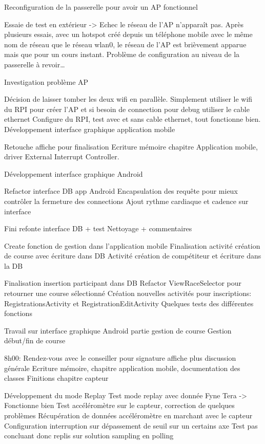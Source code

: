 \begin{multicols}{2}
Reconfiguration de la passerelle pour avoir un AP fonctionnel

Essaie de test en extérieur -> Echec le réseau de l’AP n’apparaît pas. Après plusieurs essais, avec un hotspot créé depuis un téléphone mobile avec le même nom de réseau que le réseau wlan0, le réseau de l’AP est brièvement apparue mais que pour un cours instant. Problème de configuration au niveau de la passerelle à revoir…

Investigation problème AP

Décision de laisser tomber les deux wifi en parallèle. Simplement utiliser le wifi du RPI pour créer l’AP et si besoin de connection pour debug utiliser le cable ethernet
Configure du RPI, test avec et sans cable ethernet, tout fonctionne bien.
Développement interface graphique application mobile

Retouche affiche pour finalisation
Ecriture mémoire chapitre Application mobile, driver External Interrupt Controller.

Développement interface graphique Android

Refactor interface DB app Android
Encapsulation des requête pour mieux contrôler la fermeture des connections
Ajout rythme cardiaque et cadence sur interface

Fini refonte interface DB + test
Nettoyage + commentaires

Create fonction de gestion dans l’application mobile
Finalisation activité création de course avec écriture dans DB
Activité création de compétiteur et écriture dans la DB

Finalisation insertion participant dans DB
Refactor ViewRaceSelector pour retourner une course sélectionné
Création nouvelles activités pour inscriptions: RegistrationsActivity et RegistrationEditActivity
Quelques tests des différentes fonctions

Travail sur interface graphique Android partie gestion de course
Gestion début/fin de course

8h00: Rendez-vous avec le conseiller pour signature affiche plus discussion générale
Ecriture mémoire, chapitre application mobile, documentation des classes
Finitions chapitre capteur

Développement du mode Replay
Test mode replay avec donnée Fyne Tera -> Fonctionne bien
Test accéléromètre sur le capteur, correction de quelques problèmes
Récupération de données accéléromètre en marchant avec le capteur
Configuration interruption sur dépassement de seuil sur un certains axe
Test pas concluant donc replis sur solution sampling en polling


\end{multicols}
